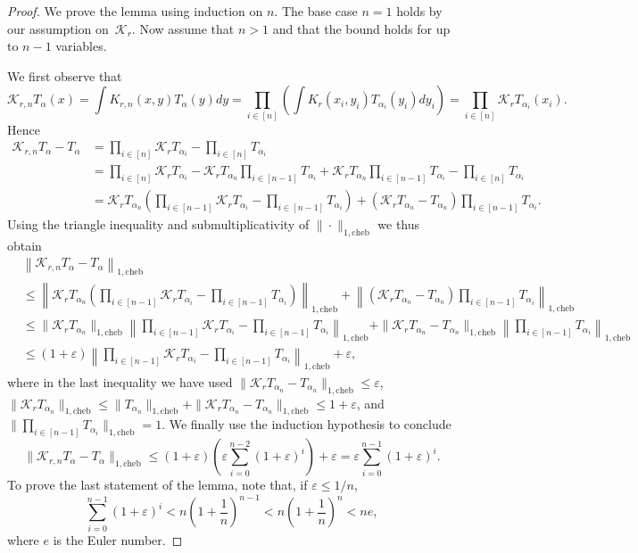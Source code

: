 \documentclass[11pt]{article}
\renewcommand{\epsilon}{\varepsilon}
\newcommand{\eps}{\epsilon}
\theoremstyle{definition}
\newcommand{\cheb}{{1,\mathrm{cheb}}}
\begin{document}
\begin{proof}
We prove the lemma using induction on $n$. The base case $n=1$ holds by our assumption on~$\mathcal K_r$. Now assume that $n>1$ and that the bound holds for up to $n-1$ variables.

We first observe that
\[
\mathcal K_{r,n} T_\alpha (x) = \int K_{r,n}(x,y) T_\alpha(y) dy = \prod_{i \in [n]} \left( \int K_r(x_i,y_i) T_{\alpha_i}(y_i) dy_i\right) = \prod_{i \in [n]} \mathcal K_r T_{\alpha_i}(x_i).
\]
Hence
\begin{align*}
\mathcal K_{r,n} T_\alpha - T_\alpha &= \prod_{i \in [n]} \mathcal K_r T_{\alpha_i} - \prod_{i \in [n]} T_{\alpha_i} \\
&= \prod_{i \in [n]} \mathcal K_r T_{\alpha_i} - \mathcal K_r T_{\alpha_n} \prod_{i \in [n-1]} T_{\alpha_i} + \mathcal K_r T_{\alpha_n} \prod_{i \in [n-1]} T_{\alpha_i} - \prod_{i \in [n]} T_{\alpha_i}\\
&= \mathcal K_r T_{\alpha_n} \left(\prod_{i \in [n-1]} \mathcal K_r T_{\alpha_i} - \prod_{i \in [n-1]} T_{\alpha_i}\right) + \left(\mathcal K_r T_{\alpha_n} -T_{\alpha_n} \right) \prod_{i \in [n-1]} T_{\alpha_i}.
\end{align*}
Using the triangle inequality and submultiplicativity of $\|\cdot\|_\cheb$ we thus obtain
\begin{align*}
    &\left\|\mathcal K_{r,n} T_\alpha - T_\alpha\right\|_\cheb \\
    &\leq  \left\| \mathcal K_r T_{\alpha_n} \left(\prod_{i \in [n-1]} \mathcal K_r T_{\alpha_i} - \prod_{i \in [n-1]} T_{\alpha_i}\right)\right\|_\cheb + \left\|\left(\mathcal K_r T_{\alpha_n} -T_{\alpha_n} \right) \prod_{i \in [n-1]} T_{\alpha_i}\right\|_\cheb \\
    &\leq \| \mathcal K_r T_{\alpha_n}\|_\cheb \left\|\prod_{i \in [n-1]} \mathcal K_r T_{\alpha_i} - \prod_{i \in [n-1]} T_{\alpha_i}\right\|_\cheb + \|\mathcal K_r T_{\alpha_n} -T_{\alpha_n}\|_\cheb \left\|\prod_{i \in [n-1]} T_{\alpha_i}\right\|_\cheb \\
    &\leq (1+\eps) \left\|\prod_{i \in [n-1]} \mathcal K_r T_{\alpha_i} - \prod_{i \in [n-1]} T_{\alpha_i}\right\|_\cheb + \eps,
\end{align*}
where in the last inequality we have used $\|\mathcal K_r T_{\alpha_n} - T_{\alpha_n}\|_\cheb \leq \eps$, $\|\mathcal K_r T_{\alpha_n}\|_\cheb \leq \|T_{\alpha_n}\|_\cheb + \|\mathcal K_r T_{\alpha_n} - T_{\alpha_n}\|_\cheb \leq 1+\eps$, and $\|\prod_{i \in [n-1]} T_{\alpha_i}\|_\cheb = 1$. We finally use the induction hypothesis to conclude
\[
\|\mathcal K_{r,n} T_\alpha - T_\alpha\|_\cheb \leq (1+\eps) \left(\eps \sum_{i=0}^{n-2} (1+\eps)^i\right) + \eps = \eps \sum_{i=0}^{n-1} (1+\eps)^i.
\]
{To prove the last statement of the lemma, note that, if $\eps \le 1/n$,
\[
\sum_{i=0}^{n-1} (1+\eps)^i < n\left(1+ \frac{1}{n}\right)^{n-1} < n\left(1+ \frac{1}{n}\right)^{n} < ne,
\]
where $e$ is the Euler number.}
\end{proof}
\end{document}
